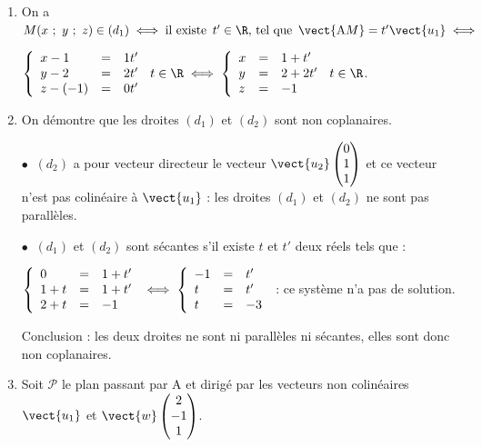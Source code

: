 \begin{enumerate}
\item %

On a $M(x~;~y~;~z) \in (d_1) \iff \text{il existe }\, t' \in \R, \, \text{tel que } \, \vect{\text{A}M} = t'\vect{u_1} \iff $

$\left\{\begin{array}{l c l}
x- 1&=&1t'\\
y - 2&=&2t'\\
z-(-1)&=&0t'
\end{array}\right.\, t \in \R \iff \left\{\begin{array}{l c l}
x &=&1 + t'\\
y &=&2 + 2t'\\
z&=&- 1
\end{array}\right.\, t \in \R $.

\item On démontre que les droites $(d_1)$ et $(d_2)$ sont non coplanaires.

$\bullet~$ $(d_2)$ a pour vecteur directeur le vecteur $\vect{u_2}\begin{pmatrix}0\\1\\1\end{pmatrix}$ et ce vecteur n'est pas colinéaire à $\vect{u_1}$ : les droites $(d_1)$ et $(d_2)$ ne sont pas parallèles.

$\bullet~$ $(d_1)$ et $(d_2)$ sont sécantes s'il existe $t$ et $t'$ deux réels tels que :

$\left\{\begin{array}{l c l}
0&=&1 + t'\\
1 + t&=&1 + t'\\
2 + t &=&-1 \\
\end{array}\right.\iff \left\{\begin{array}{l c l}
-1&=& t'\\
t & =&t'\\
t &=&-3 \\
\end{array}\right.$ : ce système n'a pas de solution.

Conclusion : les deux droites ne sont ni parallèles ni sécantes, elles sont donc non coplanaires.
\item Soit $\mathcal{P}$ le plan passant par A et dirigé par les vecteurs non colinéaires $\vect{u_1}$ et $\vect{w}\begin{pmatrix}2\\-1\\1\\\end{pmatrix}$.


\end{enumerate}
